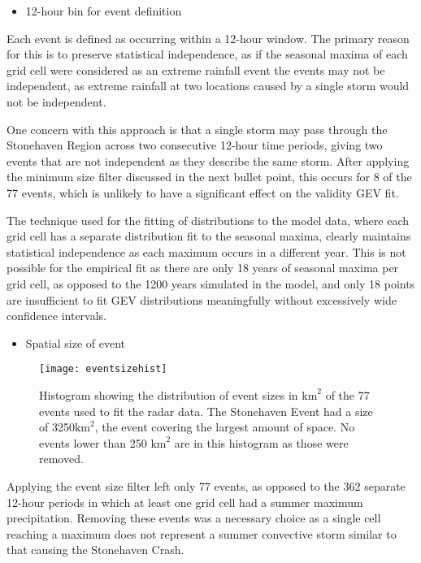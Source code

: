 \begin{itemize}\item 12-hour bin for event definition\end{itemize}

Each event is defined as occurring within a 12-hour window.
The primary reason for this is to preserve statistical independence,
    as if the seasonal maxima of each grid cell were considered as an extreme rainfall event
    the events may not be independent,
    as extreme rainfall at two locations caused by a single storm would not be independent.

One concern with this approach is that a single storm may pass through the Stonehaven Region
    across two consecutive 12-hour time periods,
    giving two events that are not independent as they describe the same storm.
After applying the minimum size filter discussed in the next bullet point,
    this occurs for 8 of the 77 events,
    which is unlikely to have a significant effect on the validity GEV fit.

The technique used for the fitting of distributions to the model data,
    where each grid cell has a separate distribution fit to the seasonal maxima,
    clearly maintains statistical independence as each maximum occurs in a different year.
This is not possible for the empirical fit as there are only 18 years of seasonal maxima per grid cell,
    as opposed to the 1200 years simulated in the model,
    and only 18 points are insufficient to fit GEV distributions meaningfully without excessively wide confidence intervals.

\begin{itemize}\item Spatial size of event\end{itemize}

\begin{figure}[H]
    \centering
    \texttt{[image: eventsizehist]}
    \caption[Histogram showing the distribution of event sizes.]{
        Histogram showing the distribution of event sizes in $\text{km}^2$ of the 77 events used to fit the radar data.
    The Stonehaven Event had a size of 3250$\text{km}^2$,
        the event covering the largest amount of space.
    No events lower than 250 $\text{km}^2$ are in this histogram as those were removed.}
    \label{fig:eventsizehist}
\end{figure}

Applying the event size filter left only 77 events, as opposed to the 362 separate 12-hour periods in which at least one grid cell had a summer maximum precipitation.
Removing these events was a necessary choice as a single cell reaching a maximum does not represent a summer convective storm similar to that causing the Stonehaven Crash.

